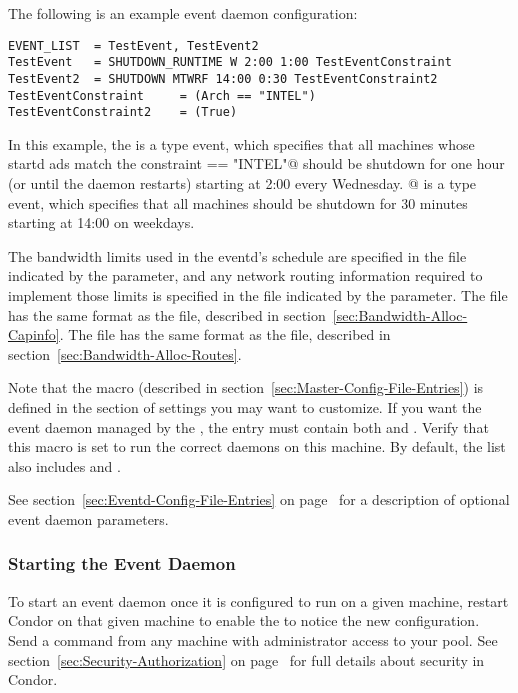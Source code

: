 The following is an example event daemon configuration:
\begin{verbatim}
EVENT_LIST	= TestEvent, TestEvent2
TestEvent	= SHUTDOWN_RUNTIME W 2:00 1:00 TestEventConstraint
TestEvent2	= SHUTDOWN MTWRF 14:00 0:30 TestEventConstraint2
TestEventConstraint		= (Arch == "INTEL")
TestEventConstraint2	= (True)
\end{verbatim}

In this example, the \verb@TestEvent@ is a 
type event, which
specifies that all machines whose startd ads match the constraint
\verb@Arch == "INTEL"@ should be shutdown for one hour (or until the
 daemon restarts) starting at 2:00 every Wednesday.
@ is a  type event, which specifies
that all machines should be shutdown for 30 minutes starting at
14:00 on weekdays.

The bandwidth limits used in the eventd's schedule are specified in
the file indicated by the  parameter, and
any network routing information required to implement those limits is
specified in the file indicated by the 
parameter.
The  file has the same
format as the  file, described in
section~\ref{sec:Bandwidth-Alloc-Capinfo}.
The  file has the same
format as the  file, described in
section~\ref{sec:Bandwidth-Alloc-Routes}.

Note that the  macro (described in
section~\ref{sec:Master-Config-File-Entries}) is defined in the
section of settings you may want to customize.
If you want the event daemon managed by the , the
 entry must contain both 
 and .
Verify that this macro is set to run the correct daemons on
this machine.  By default, the list also includes
 and .

See section~\ref{sec:Eventd-Config-File-Entries} on
page~\pageref{sec:Eventd-Config-File-Entries} for a description of
optional event daemon parameters.

\subsubsection{\label{sec:Start-EventD} 
Starting the Event Daemon} 

To start an event daemon once it is configured to run on a given
machine, restart Condor on that given machine to enable
the  to notice the new configuration.
Send a  command from any machine
with administrator access to your pool.
See section~\ref{sec:Security-Authorization} on
page~\pageref{sec:Security-Authorization} for full details about
security in Condor.


